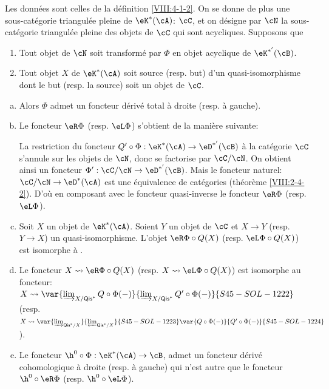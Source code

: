 \begin{theorem}\label{VIII:4-2-3} %
Les données sont celles de la définition \ref{VIII:4-1-2}. On se donne de 
plus une sous-catégorie triangulée pleine de $\eK^\ast(\cA)$: $\cC$, et on 
désigne par $\cN$ la sous-catégorie triangulée pleine des objets de $\cC$ 
qui sont acycliques. Supposons que 
\begin{enumerate}[(1)]
  \item Tout objet de $\cN$ soit transformé par $\Phi$ en objet acyclique 
    de $\eK^{\ast'}(\cB)$. 
  \item Tout objet $X$ de $\eK^\ast(\cA)$ soit source (resp. but) d'un 
    quasi-isomorphisme dont le but (resp. la source) soit un objet de $\cC$. 
\end{enumerate}
\begin{enumerate}[a)]
  \item Alors $\Phi$ admet un foncteur dérivé total à droite (resp. 
    à gauche). 
  \item Le foncteur $\eR \Phi$ (resp. $\eL \Phi$) s'obtient de la manière 
    suivante: 
    
    La restriction du foncteur 
    $Q'\circ \Phi:\eK^\ast(\cA) \to \eD^{\ast'}(\cB)$ à la catégorie $\cC$ 
    s'annule sur les objets de $\cN$, donc se factorise par $\cC/\cN$. On 
    obtient ainsi un foncteur $\Phi':\cC/\cN\to \eD^{\ast'}(\cB)$. Mais le 
    foncteur naturel: $\cC/\cN\to \eD^\ast(\cA)$ est une équivalence de 
    catégories (théorème \ref{VIII:2-4-2}). D'où en composant avec le 
    foncteur quasi-inverse le foncteur $\eR\Phi$ (resp. $\eL \Phi$). 
  \item Soit $X$ un objet de $\eK^\ast(\cA)$. Soient $Y$ un objet de $\cC$ et 
    $X\to Y$ (resp. $Y\to X$) un quasi-isomorphisme. L'objet 
    $\eR\Phi\circ Q(X)$ (resp. $\eL \Phi\circ Q(X)$) est isomorphe à 
    . 
  \item Le foncteur $X\leadsto \eR\Phi\circ Q(X)$ (resp. 
    $X\leadsto \eL \Phi\circ Q(X)$) est isomorphe au foncteur: 
    $X\leadsto \var{\varinjlim_{X/\mathsf{Qis}^\ast} Q\circ\Phi(-)}{\varinjlim_{X/\mathsf{Qis}^\ast} Q'\circ\Phi(-)}{S45-SOL-1222}$ (resp. 
    $X\leadsto \var{\varinjlim_{\mathsf{Qis}^\ast/X}}{\varprojlim_{\mathsf{Qis}^\ast/X}}{S45-SOL-1223} \var{Q\circ \Phi(-)}{Q'\circ \Phi(-)}{S45-SOL-1224}$). 
  \item Le foncteur $\h^0{}\circ \Phi:\eK^\ast(\cA)\to \cB$, admet un 
    foncteur dérivé cohomologique à droite (resp. à gauche) qui n'est 
    autre que le foncteur $\h^0{}\circ\eR\Phi$ (resp. $\h^0{}\circ \eL\Phi$). 
\end{enumerate}
\end{theorem}





